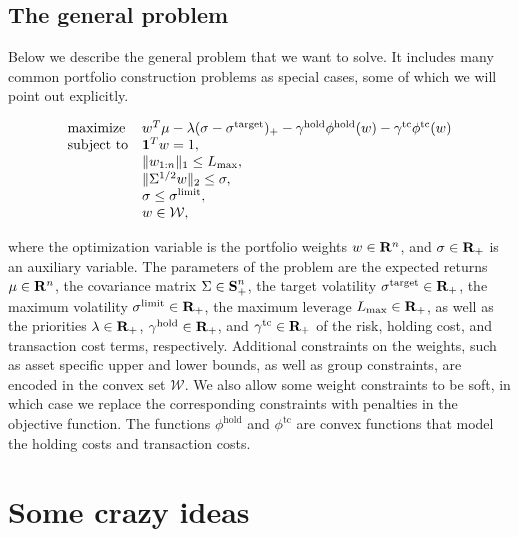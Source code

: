 \documentclass[12pt]{article}
\begin{document}
\subsection{The general problem}
Below we describe the general problem that we want to solve. It includes
many common portfolio construction problems as special cases, some of which
we will point out explicitly.

\begin{equation}
\begin{array}{ll}
\mbox{maximize}   &  w^T\mu - \lambda (\sigma - \sigma^{\text{target}})_+ -
\gamma^{\text{hold}}\phi^{\text{hold}}(w) - \gamma^{\text{tc}}\phi^{\text{tc}}(w)\\
\mbox{subject to} &  \mathbf 1^T w = 1,\\
                  &  \|w_{1:n}\|_1 \leq L_{\max},\\
                  &  \|\Sigma^{1/2} w\|_2 \leq \sigma,\\
                  &  \sigma \leq \sigma^{\text{limit}},\\
                  &  w \in \mathcal{W},\\
\end{array}
\label{eq:general}
\end{equation}

where the optimization variable is the portfolio weights $w \in \mathbf{R}^n$, and
$\sigma \in {\mbox{\bf R}}_+$ is an auxiliary variable. The parameters of the problem
are the expected returns $\mu \in \mathbf{R}^n$, the covariance matrix $\Sigma \in {\mbox{\bf S}}^n_+$,
the target volatility $\sigma^{\text{target}} \in {\mbox{\bf R}}_+$, the maximum
volatility $\sigma^{\text{limit}} \in {\mbox{\bf R}}_+$, the maximum leverage
$L_{\max} \in {\mbox{\bf R}}_+$, as well as the priorities $\lambda \in {\mbox{\bf R}}_+$,
$\gamma^{\text{hold}} \in {\mbox{\bf R}}_+$, and $\gamma^{\text{tc}} \in {\mbox{\bf R}}_+$ of
the risk, holding cost, and transaction cost terms, respectively. Additional
constraints on the weights, such as asset specific upper and lower bounds, as
well as group constraints, are encoded in the convex set $\mathcal{W}$.
We also allow some weight constraints to be soft, in which case we replace
the corresponding constraints with penalties in the objective function.
The functions $\phi^{\text{hold}}$ and $\phi^{\text{tc}}$ are convex functions
that model the holding costs and transaction costs.


\section{Some crazy ideas}
\end{document}
